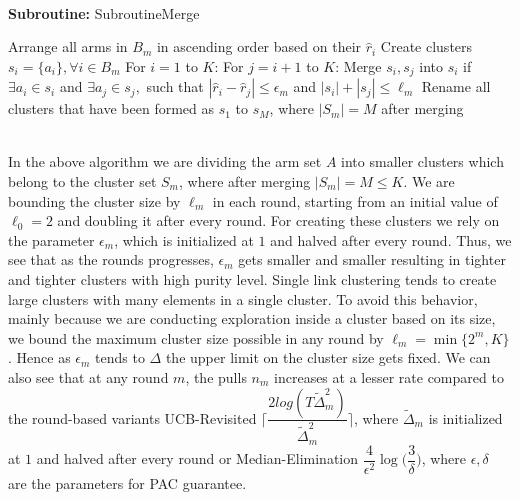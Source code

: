 \noindent\makebox[\linewidth]{\rule{\textwidth}{0.4pt}}\\[-0.6cm]
\newline
\textbf{Subroutine:} SubroutineMerge\\[-0.3cm]
\begin{algorithmic}[1]
\State \hspace*{2em} Arrange all arms in $B_{m}$ in ascending order based on their $\hat{r}_{i}$
\State \hspace*{2em} Create clusters $s_{i}=\lbrace a_{i}\rbrace, \forall i\in B_{m}$
\State \hspace*{2em} For $i=1$ to $K$:
\State \hspace*{4em} For $j=i+1$ to $K$:
\State \hspace*{6em} Merge $s_{i},s_{j}$ into $s_{i}$ if $\exists a_{i}\in s_{i} $ and $\exists a_{j}\in s_{j},$ such that $|\hat{r}_{i}-\hat{r}_{j}|\leq\epsilon_{m}$ and $|s_{i}|+|s_{j}|\leq \ell_{m}$
\State \hspace*{2em} Rename all clusters that have been formed as $s_{1}$ to $s_{M}$, where $|S_{m}|=M$ after merging
\end{algorithmic}
\noindent\makebox[\linewidth]{\rule{\textwidth}{0.4pt}}\\[-0.6cm]




In the above algorithm we are dividing the arm set $A$ into smaller clusters which belong to the cluster set $S_{m}$, where after merging $|S_{m}|=M\leq K$. We are bounding the cluster size by $\ell_{m}$ in each round, starting from an initial value of $\ell_{0}=2$ and doubling it after every round. For creating these clusters we rely on the parameter $\epsilon_{m}$, which is initialized at $1$ and halved after every round. 
Thus, we see that as the rounds progresses, $\epsilon_{m}$ gets smaller and smaller resulting in tighter and tighter clusters with high purity level. Single link clustering tends to create large clusters with many elements in a single cluster. To avoid this behavior, mainly because we are conducting exploration inside a cluster based on its size, we bound the maximum cluster size possible in any round by $\ell_{m}=\min\lbrace 2^{m}, K \rbrace$. Hence as $\epsilon_{m}$ tends to $\Delta$ the upper limit on the cluster size gets fixed. We can also see that at any round $m$, the pulls $n_{m}$ increases at a lesser rate compared to the round-based variants UCB-Revisited $\bigg\lceil \dfrac{2log(T\tilde{\Delta}_{m}^{2})}{\tilde{\Delta}_{m}^{2}} \bigg\rceil$, where $\tilde{\Delta}_{m}$ is initialized at $1$ and halved after every round or Median-Elimination $\dfrac{4}{\epsilon^{2}}\log\big(\dfrac{3}{\delta}\big)$, where $\epsilon,\delta$ are the parameters for PAC guarantee.


